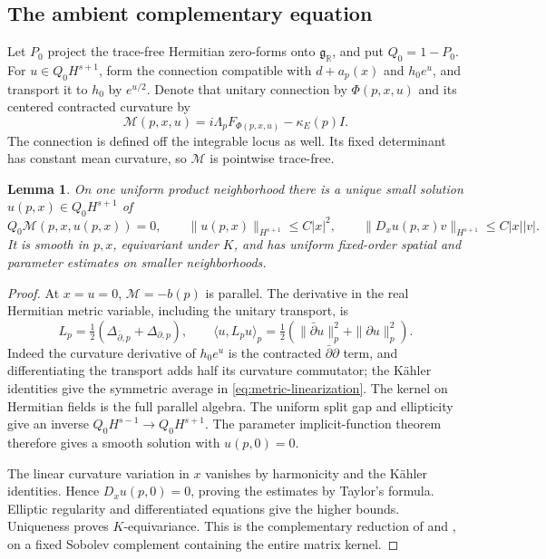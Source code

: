 \documentclass[11pt]{amsart}
\newtheorem{lemma}[theorem]{Lemma}
\theoremstyle{definition}
\theoremstyle{remark}
\newcommand{\RR}{\mathbb R}
\begin{document}
\subsection{The ambient complementary equation}
Let $P_0$ project the trace-free Hermitian zero-forms onto
$\mathfrak g_{\RR}$, and put $Q_0=1-P_0$. For $u\in Q_0H^{s+1}$,
form the connection compatible with $d+a_p(x)$ and $h_0e^u$, and
transport it to $h_0$ by $e^{u/2}$. Denote that unitary connection by
$\Phi(p,x,u)$ and its centered contracted curvature by
\begin{equation}\label{eq:mean-curvature}
 \mathcal M(p,x,u)=i\Lambda_pF_{\Phi(p,x,u)}-\kappa_E(p)I.
\end{equation}
The connection is defined off the integrable locus as well. Its fixed
determinant has constant mean curvature, so $\mathcal M$ is pointwise
trace-free.

\begin{lemma}\label{lem:complement}
On one uniform product neighborhood there is a unique small solution
$u(p,x)\in Q_0H^{s+1}$ of
\begin{equation}\label{eq:complement}
 Q_0\mathcal M(p,x,u(p,x))=0,
 \qquad \|u(p,x)\|_{H^{s+1}}\le C|x|^2,
 \qquad \|D_xu(p,x)v\|_{H^{s+1}}\le C|x||v|.
\end{equation}
It is smooth in $p,x$, equivariant under $K$, and has uniform
fixed-order spatial and parameter estimates on smaller neighborhoods.
\end{lemma}
\begin{proof}
At $x=u=0$, $\mathcal M=-b(p)$ is parallel. The derivative in the
real Hermitian metric variable, including the unitary transport, is
\begin{equation}\label{eq:metric-linearization}
 L_p=\tfrac12(\Delta_{\bar\partial,p}+\Delta_{\partial,p}),\qquad
 \langle u,L_pu\rangle_p=\tfrac12
       (\|\bar\partial u\|_p^2+\|\partial u\|_p^2).
\end{equation}
Indeed the curvature derivative of $h_0e^u$ is the contracted
$\bar\partial\partial$ term, and differentiating the transport
adds half its curvature commutator; the K\"ahler identities give
the symmetric average in \eqref{eq:metric-linearization}. The kernel
on Hermitian fields is the full parallel algebra. The uniform split
gap and ellipticity give an inverse
$Q_0H^{s-1}\to Q_0H^{s+1}$. The parameter implicit-function theorem
therefore gives a smooth solution with $u(p,0)=0$.

The linear curvature variation in $x$ vanishes by harmonicity and
the K\"ahler identities. Hence $D_xu(p,0)=0$, proving the estimates
by Taylor's formula. Elliptic regularity and differentiated equations
give the higher bounds. Uniqueness proves $K$-equivariance. This is
the complementary reduction of \cite[Section 3]{ClarkeTipler24}
and \cite[Lemma 4.1 and Proposition 4.2]{Delloque25}, on a fixed
Sobolev complement containing the entire matrix kernel.
\end{proof}
\end{document}
